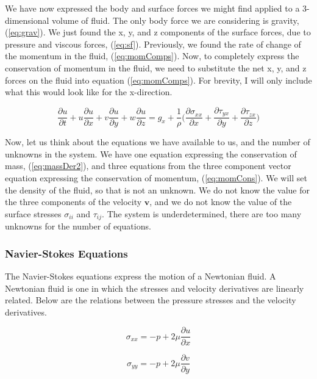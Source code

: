 \documentclass[twocolumn,12pth]{article}
\begin{document}
We have now expressed the body and surface forces we might find applied to a 3-dimensional volume of fluid. 
The only body force we are considering is gravity, (\ref{eq:grav}).
We just found the x, y, and z components of the surface forces, due to pressure and viscous forces, (\ref{eq:sf}).
Previously, we found the rate of change of the momentum in the fluid, (\ref{eq:momComps}).
Now, to completely express the conservation of momentum in the fluid, we need to substitute the net x, y, and z forces on the fluid into equation (\ref{eq:momComps}).
For brevity, I will only include what this would look like for the x-direction.

\begin{equation}
\frac{\partial{u}}{\partial{t}} + u\frac{\partial{u}}{\partial{x}} + v\frac{\partial{u}}{\partial{y}} + w\frac{\partial{u}}{\partial{z}} = g_x + \frac{1}{\rho} \bigg(\frac{\partial{\sigma_{xx}}}{\partial{x}} + \frac{\partial{\tau_{yx}}}{\partial{y}} + \frac{\partial{\tau_{zx}}}{\partial{z}} \bigg)
\label{eq:momCons}
\end{equation}

Now, let us think about the equations we have available to us, and the number of unknowns in the system.
We have one equation expressing the conservation of mass, (\ref{eq:massDer2}), and three equations from the three component vector equation expressing the conservation of momentum, (\ref{eq:momCons}).
We will set the density of the fluid, so that is not an unknown.
We do not know the value for the three components of the velocity $\mathbf{v}$, and we do not know the value of the surface stresses $\sigma_{ii}$ and $\tau_{ij}$.
The system is underdetermined, there are too many unknowns for the number of equations.


\subsubsection{Navier-Stokes Equations}

The Navier-Stokes equations express the motion of a Newtonian fluid.
A Newtonian fluid is one in which the stresses and velocity derivatives are linearly related.
Below are the relations between the pressure stresses and the velocity derivatives.

\begin{equation}
\sigma_{xx} = -p + 2\mu\frac{\partial{u}}{\partial{x}}
\label{eq:norms}
\end{equation}

\begin{equation*}
\sigma_{yy} = -p + 2\mu\frac{\partial{v}}{\partial{y}}
\end{equation*}
\end{document}
